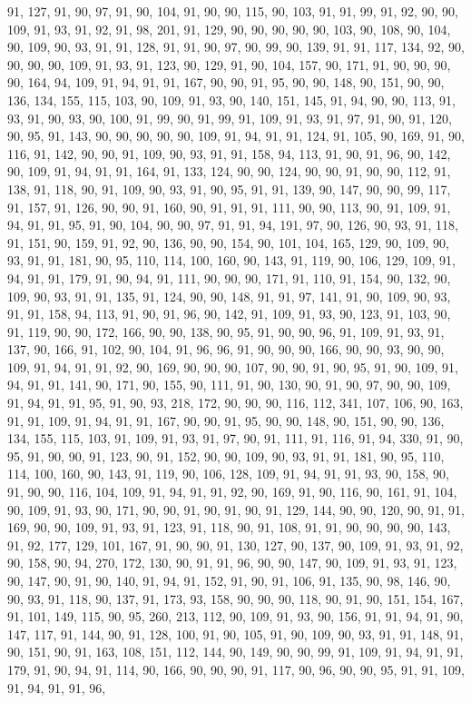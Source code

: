 \begin{sloppypar}
91, 127, 91, 90, 97, 91, 90, 104, 91, 90, 90, 115, 90, 103, 91, 91, 99, 91, 92, 90, 90, 109, 91, 93, 91, 92, 91, 98, 201, 91, 129, 90, 90, 90, 90, 90, 103, 90, 108, 90, 104, 90, 109, 90, 93, 91, 91, 128, 91, 91, 90, 97, 90, 99, 90, 139, 91, 91, 117, 134, 92, 90, 90, 90, 90, 109, 91, 93, 91, 123, 90, 129, 91, 90, 104, 157, 90, 171, 91, 90, 90, 90, 90, 164, 94, 109, 91, 94, 91, 91, 167, 90, 90, 91, 95, 90, 90, 148, 90, 151, 90, 90, 136, 134, 155, 115, 103, 90, 109, 91, 93, 90, 140, 151, 145, 91, 94, 90, 90, 113, 91, 93, 91, 90, 93, 90, 100, 91, 99, 90, 91, 99, 91, 109, 91, 93, 91, 97, 91, 90, 91, 120, 90, 95, 91, 143, 90, 90, 90, 90, 90, 109, 91, 94, 91, 91, 124, 91, 105, 90, 169, 91, 90, 116, 91, 142, 90, 90, 91, 109, 90, 93, 91, 91, 158, 94, 113, 91, 90, 91, 96, 90, 142, 90, 109, 91, 94, 91, 91, 164, 91, 133, 124, 90, 90, 124, 90, 90, 91, 90, 90, 112, 91, 138, 91, 118, 90, 91, 109, 90, 93, 91, 90, 95, 91, 91, 139, 90, 147, 90, 90, 99, 117, 91, 157, 91, 126, 90, 90, 91, 160, 90, 91, 91, 91, 111, 90, 90, 113, 90, 91, 109, 91, 94, 91, 91, 95, 91, 90, 104, 90, 90, 97, 91, 91, 94, 191, 97, 90, 126, 90, 93, 91, 118, 91, 151, 90, 159, 91, 92, 90, 136, 90, 90, 154, 90, 101, 104, 165, 129, 90, 109, 90, 93, 91, 91, 181, 90, 95, 110, 114, 100, 160, 90, 143, 91, 119, 90, 106, 129, 109, 91, 94, 91, 91, 179, 91, 90, 94, 91, 111, 90, 90, 90, 171, 91, 110, 91, 154, 90, 132, 90, 109, 90, 93, 91, 91, 135, 91, 124, 90, 90, 148, 91, 91, 97, 141, 91, 90, 109, 90, 93, 91, 91, 158, 94, 113, 91, 90, 91, 96, 90, 142, 91, 109, 91, 93, 90, 123, 91, 103, 90, 91, 119, 90, 90, 172, 166, 90, 90, 138, 90, 95, 91, 90, 90, 96, 91, 109, 91, 93, 91, 137, 90, 166, 91, 102, 90, 104, 91, 96, 96, 91, 90, 90, 90, 166, 90, 90, 93, 90, 90, 109, 91, 94, 91, 91, 92, 90, 169, 90, 90, 90, 107, 90, 90, 91, 90, 95, 91, 90, 109, 91, 94, 91, 91, 141, 90, 171, 90, 155, 90, 111, 91, 90, 130, 90, 91, 90, 97, 90, 90, 109, 91, 94, 91, 91, 95, 91, 90, 93, 218, 172, 90, 90, 90, 116, 112, 341, 107, 106, 90, 163, 91, 91, 109, 91, 94, 91, 91, 167, 90, 90, 91, 95, 90, 90, 148, 90, 151, 90, 90, 136, 134, 155, 115, 103, 91, 109, 91, 93, 91, 97, 90, 91, 111, 91, 116, 91, 94, 330, 91, 90, 95, 91, 90, 90, 91, 123, 90, 91, 152, 90, 90, 109, 90, 93, 91, 91, 181, 90, 95, 110, 114, 100, 160, 90, 143, 91, 119, 90, 106, 128, 109, 91, 94, 91, 91, 93, 90, 158, 90, 91, 90, 90, 116, 104, 109, 91, 94, 91, 91, 92, 90, 169, 91, 90, 116, 90, 161, 91, 104, 90, 109, 91, 93, 90, 171, 90, 90, 91, 90, 91, 90, 91, 129, 144, 90, 90, 120, 90, 91, 91, 169, 90, 90, 109, 91, 93, 91, 123, 91, 118, 90, 91, 108, 91, 91, 90, 90, 90, 90, 143, 91, 92, 177, 129, 101, 167, 91, 90, 90, 91, 130, 127, 90, 137, 90, 109, 91, 93, 91, 92, 90, 158, 90, 94, 270, 172, 130, 90, 91, 91, 96, 90, 90, 147, 90, 109, 91, 93, 91, 123, 90, 147, 90, 91, 90, 140, 91, 94, 91, 152, 91, 90, 91, 106, 91, 135, 90, 98, 146, 90, 90, 93, 91, 118, 90, 137, 91, 173, 93, 158, 90, 90, 90, 118, 90, 91, 90, 151, 154, 167, 91, 101, 149, 115, 90, 95, 260, 213, 112, 90, 109, 91, 93, 90, 156, 91, 91, 94, 91, 90, 147, 117, 91, 144, 90, 91, 128, 100, 91, 90, 105, 91, 90, 109, 90, 93, 91, 91, 148, 91, 90, 151, 90, 91, 163, 108, 151, 112, 144, 90, 149, 90, 90, 99, 91, 109, 91, 94, 91, 91, 179, 91, 90, 94, 91, 114, 90, 166, 90, 90, 90, 91, 117, 90, 96, 90, 90, 95, 91, 91, 109, 91, 94, 91, 91, 96, 
\end{sloppypar}
